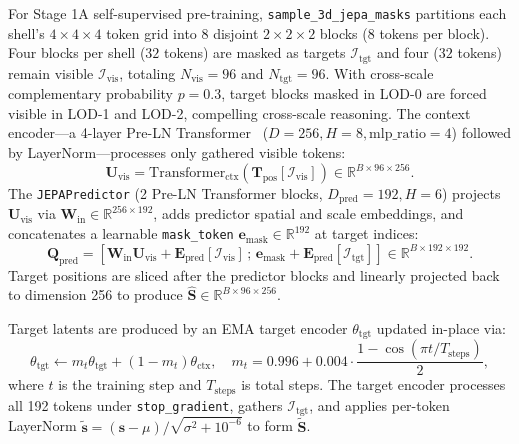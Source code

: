 \documentclass[runningheads]{llncs}
\begin{document}
For Stage 1A self-supervised pre-training, \texttt{sample\_3d\_jepa\_masks} partitions each shell's $4\times4\times4$ token grid into 8 disjoint $2\times2\times2$ blocks ($8$ tokens per block). Four blocks per shell ($32$ tokens) are masked as targets $\mathcal{I}_{\text{tgt}}$ and four ($32$ tokens) remain visible $\mathcal{I}_{\text{vis}}$, totaling $N_{\text{vis}} = 96$ and $N_{\text{tgt}} = 96$. With cross-scale complementary probability $p = 0.3$, target blocks masked in LOD-0 are forced visible in LOD-1 and LOD-2, compelling cross-scale reasoning. The context encoder—a 4-layer Pre-LN Transformer~\cite{vaswani2017attention} ($D = 256, H = 8, \text{mlp\_ratio} = 4$) followed by LayerNorm—processes only gathered visible tokens:
\begin{equation}
\mathbf{U}_{\text{vis}} = \mathrm{Transformer}_{\text{ctx}}\left(\mathbf{T}_{\text{pos}}[\mathcal{I}_{\text{vis}}]\right) \in \mathbb{R}^{B \times 96 \times 256}.
\end{equation}
The \texttt{JEPAPredictor} (2 Pre-LN Transformer blocks, $D_{\text{pred}} = 192, H = 6$) projects $\mathbf{U}_{\text{vis}}$ via $\mathbf{W}_{\text{in}} \in \mathbb{R}^{256 \times 192}$, adds predictor spatial and scale embeddings, and concatenates a learnable \texttt{mask\_token} $\mathbf{e}_{\text{mask}} \in \mathbb{R}^{192}$ at target indices:
\begin{equation}
\mathbf{Q}_{\text{pred}} = \left[\mathbf{W}_{\text{in}}\mathbf{U}_{\text{vis}} + \mathbf{E}_{\text{pred}}[\mathcal{I}_{\text{vis}}]\,;\,\mathbf{e}_{\text{mask}} + \mathbf{E}_{\text{pred}}[\mathcal{I}_{\text{tgt}}]\right] \in \mathbb{R}^{B \times 192 \times 192}.
\end{equation}
Target positions are sliced after the predictor blocks and linearly projected back to dimension 256 to produce $\hat{\mathbf{S}} \in \mathbb{R}^{B \times 96 \times 256}$.

Target latents are produced by an EMA target encoder $\theta_{\text{tgt}}$ updated in-place via:
\begin{equation}
\theta_{\text{tgt}} \leftarrow m_t \theta_{\text{tgt}} + (1 - m_t) \theta_{\text{ctx}}, \quad m_t = 0.996 + 0.004 \cdot \frac{1 - \cos(\pi t / T_{\text{steps}})}{2},
\end{equation}
where $t$ is the training step and $T_{\text{steps}}$ is total steps. The target encoder processes all 192 tokens under \texttt{stop\_gradient}, gathers $\mathcal{I}_{\text{tgt}}$, and applies per-token LayerNorm $\tilde{\mathbf{s}} = (\mathbf{s} - \mu)/\sqrt{\sigma^2 + 10^{-6}}$ to form $\tilde{\mathbf{S}}$.
\end{document}
